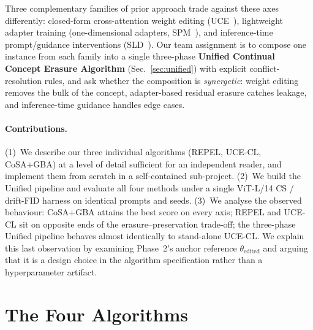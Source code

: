 \documentclass[10pt,twocolumn,letterpaper]{article}
\begin{document}
Three complementary families of prior approach trade against these axes
differently: closed-form cross-attention weight editing
(UCE~\cite{gandikota2024uce}), lightweight adapter training (one-dimensional
adapters, SPM~\cite{lyu2024one}), and inference-time prompt/guidance
interventions (SLD~\cite{schramowski2023safe}). Our team assignment
is to compose one instance from each family into a single three-phase
\textbf{Unified Continual Concept Erasure Algorithm}
(Sec.~\ref{sec:unified}) with explicit conflict-resolution rules, and ask
whether the composition is \emph{synergetic}: weight editing removes the
bulk of the concept, adapter-based residual erasure catches leakage, and
inference-time guidance handles edge cases.

\paragraph{Contributions.}
(1)~We describe our three individual algorithms (REPEL, UCE-CL,
CoSA+GBA) at a level of detail sufficient for an independent reader,
and implement them from scratch in a self-contained sub-project.
(2)~We build the Unified pipeline and evaluate all four methods under
a single ViT-L/14 CS / drift-FID harness on identical prompts and seeds.
(3)~We analyse the observed behaviour: CoSA+GBA attains the best score
on every axis; REPEL and UCE-CL sit on opposite ends of the
erasure--preservation trade-off; the three-phase Unified pipeline
behaves almost identically to stand-alone UCE-CL. We explain this last
observation by examining Phase~2's anchor reference
$\theta_\text{edited}$ and arguing that it is a design choice in the
algorithm specification rather than a hyperparameter artifact.

\section{The Four Algorithms}
\label{sec:algs}
\end{document}

